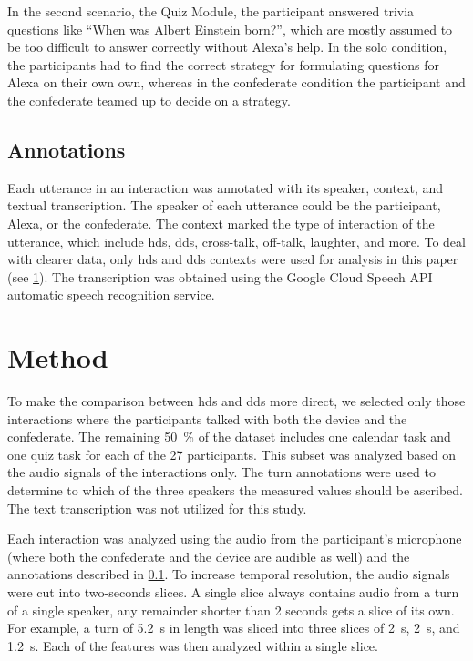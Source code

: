 In the second scenario, the Quiz Module, the participant answered trivia questions like \enquote{When was Albert Einstein born?}, which are mostly assumed to be too difficult to answer correctly without Alexa's help.
In the solo condition, the participants had to find the correct strategy for formulating questions for Alexa on their own own, whereas in the confederate condition the participant and the confederate teamed up to decide on a strategy. 

\subsection{Annotations}
\label{subsec:annotations}

Each utterance in an interaction was annotated with its speaker, context, and textual transcription.
The speaker of each utterance could be the participant, Alexa, or the confederate.
The context marked the type of interaction of the utterance, which include \ac{hds}, \ac{dds}, cross-talk, off-talk, laughter, and more.
To deal with clearer data, only \ac{hds} and \ac{dds} contexts were used for analysis in this paper (see \cref{sec:method}).
The transcription was obtained using the Google Cloud Speech API automatic speech recognition service.

\section{Method}
\label{sec:method}

To make the comparison between \ac{hds} and \ac{dds} more direct, we selected only those interactions where the participants talked with both the device and the confederate.
The remaining \SI{50}{\percent} of the dataset includes one calendar task and one quiz task for each of the 27 participants.
This subset was analyzed based on the audio signals of the interactions only.
The turn annotations were used to determine to which of the three speakers the measured values should be ascribed.
The text transcription was not utilized for this study.

Each interaction was analyzed using the audio from the participant's microphone (where both the confederate and the device are audible as well) and the annotations described in \cref{subsec:annotations}.
To increase temporal resolution, the audio signals were cut into two-seconds slices.
A single slice always contains audio from a turn of a single speaker, any remainder shorter than \si{2} seconds gets a slice of its own.
For example, a turn of \SI{5.2}{\second} in length was sliced into three slices of \SI{2}{\second}, \SI{2}{\second}, and \SI{1.2}{\second}.
Each of the features was then analyzed within a single slice.

